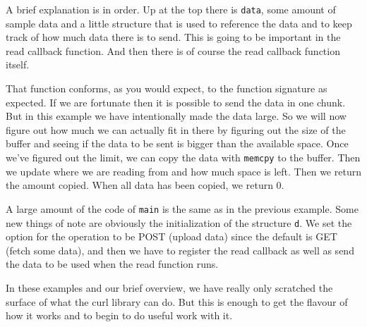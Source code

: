 A brief explanation is in order. Up at the top there is \texttt{data}, some amount of sample data and a little structure that is used to reference the data and to keep track of how much data there is to send. This is going to be important in the read callback function. And then there is of course the read callback function itself.

That function conforms, as you would expect, to the function signature as expected. If we are fortunate then it is possible to send the data in one chunk. But in this example we have intentionally made the data large. So we will now figure out how much we can actually fit in there by figuring out the size of the buffer and seeing if the data to be sent is bigger than the available space. Once we've figured out the limit, we can copy the data with \texttt{memcpy} to the buffer. Then we update where we are reading from and how much space is left. Then we return the amount copied. When all data has been copied, we return 0.

A large amount of the code of \texttt{main} is the same as in the previous example. Some new things of note are obviously the initialization of the structure \texttt{d}. We set the option for the operation to be POST (upload data) since the default is GET (fetch some data), and then we have to register the read callback as well as send the data to be used when the read function runs.

In these examples and our brief overview, we have really only scratched the surface of what the curl library can do. But this is enough to get the flavour of how it works and to begin to do useful work with it.



